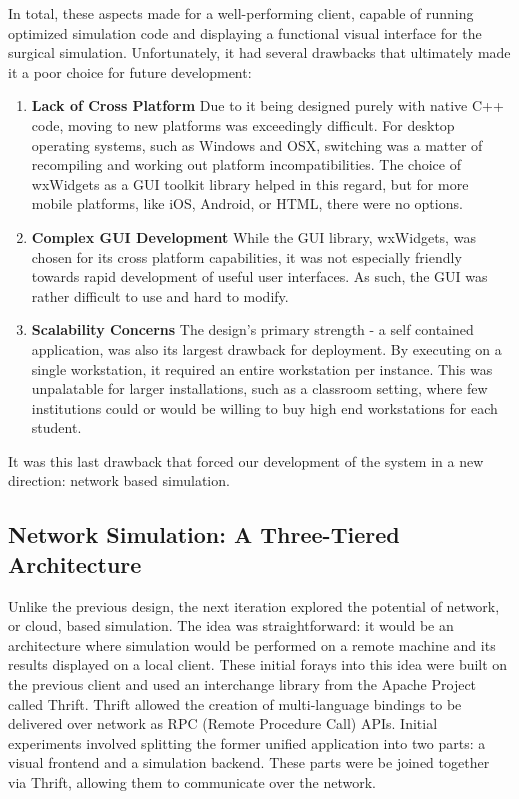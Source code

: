  In total, these aspects made for a well-performing client, capable of
 running optimized simulation code and displaying a functional visual
 interface for the surgical simulation. Unfortunately, it had several
 drawbacks that ultimately made it a poor choice for future
 development:

 \begin{enumerate}

   \item \textbf{Lack of Cross Platform} Due to it being designed
     purely with native C++ code, moving to new platforms was
     exceedingly difficult. For desktop operating systems, such as
     Windows and OSX, switching was a matter of recompiling and
     working out platform incompatibilities. The choice of wxWidgets as
     a GUI toolkit library helped in this regard, but for more mobile
     platforms, like iOS, Android, or HTML, there were no options.   
   
   \item \textbf{Complex GUI Development} While the GUI library,
     wxWidgets, was chosen for its cross platform capabilities, it was
     not especially friendly towards rapid development of useful user
     interfaces. As such, the GUI was rather difficult to use and hard
     to modify.

   \item \textbf{Scalability Concerns} The design's primary strength -
     a self contained application, was also its largest drawback for
     deployment. By executing on a single workstation, it required an
     entire workstation per instance. This was unpalatable for larger
     installations, such as a classroom setting, where few institutions
     could or would be willing to buy high end workstations for each student.
   
 \end{enumerate}

 
 It was this last drawback that forced our development of the system
 in a new direction: network based simulation.

 \subsection{Network Simulation: A Three-Tiered Architecture}
 
 Unlike the previous design, the next iteration explored the potential
 of network, or cloud, based simulation. The idea was straightforward:
 it would be an architecture where simulation would be performed on a
 remote machine and its results displayed on a local client. These
 initial forays into this idea were built on the previous client and
 used an interchange library from the Apache Project called
 Thrift. Thrift allowed the creation of multi-language bindings to be
 delivered over network as RPC (Remote Procedure Call) APIs. Initial
 experiments involved splitting the former unified application into
 two parts: a visual frontend and a simulation backend. These parts
 were be joined together via Thrift, allowing them to communicate over
 the network.

